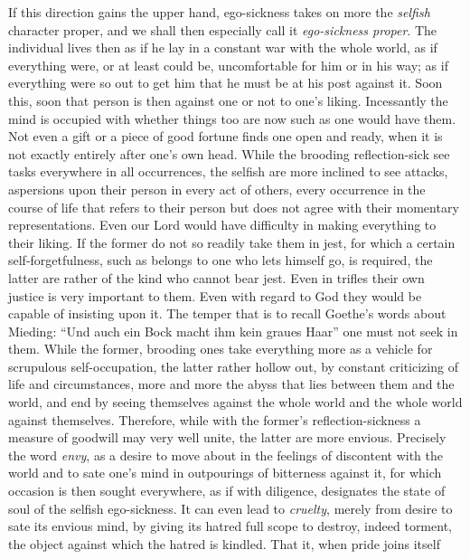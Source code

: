 \documentclass[12pt,a4paper,openany]{book}
\newcommand{\opage}[1]{\marginnote{\footnotesize\textit{[#1]}}}
\begin{document}
If this direction gains the upper hand, ego-sickness takes on more the
\emph{selfish} character proper, and we shall then
\setcounter{footnote}{0}%
\opage{119}especially call it \emph{ego-sickness proper}. The individual lives then as if he lay
in a constant war with the whole world, as if everything were, or at least could be,
uncomfortable for him or in his way; as if everything were so out to get him that he
must be at his post against it. Soon this, soon that person is then against one or
not to one's liking. Incessantly the mind is occupied with whether things too are now
such as one would have them. Not even a gift or a piece of good fortune finds one
open and ready, when it is not exactly entirely after one's own head. While the
brooding reflection-sick see tasks everywhere in all occurrences, the selfish are
more inclined to see attacks, aspersions upon their person in every act of others,
every occurrence in the course of life that refers to their person but does not
agree with their momentary representations. Even our Lord would have difficulty in
making everything to their liking. If the former do not so readily take them in
jest, for which a certain self-forgetfulness, such as belongs to one who lets
himself go, is required, the latter are rather of the kind who cannot bear jest. Even
in trifles their own justice is very important to them. Even with regard to God they
would be capable of insisting upon it. The temper that is to recall Goethe's words
about Mieding: ``Und auch ein Bock macht ihm kein graues Haar'' one must not seek in
them. While the former, brooding ones take everything more as a vehicle for
scrupulous self-occupation, the latter rather hollow out, by constant criticizing of
life and circumstances, more and more the abyss that lies between them and the
world, and end by seeing themselves against the whole world and the whole world
against themselves. Therefore, while with the former's reflection-sickness a measure
of goodwill may very well unite, the latter are more envious. Precisely the word
\emph{envy}, as a desire to move about in the feelings of discontent with the world
and to sate one's mind in outpourings of bitterness against it, for which occasion
is then sought everywhere, as if with diligence, designates the state of soul of the
selfish ego-sickness. It can even lead to \emph{cruelty}, merely from desire to sate
its
\setcounter{footnote}{0}%
\opage{120}envious mind, by giving its hatred full scope to destroy, indeed torment, the
object against which the hatred is kindled. That it, when pride joins itself
\end{document}
